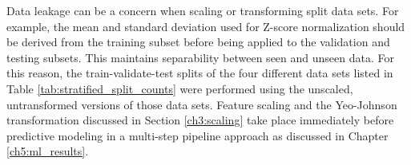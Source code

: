 Data leakage can be a concern when scaling or transforming split data sets. For example, the mean and standard deviation used for Z-score normalization should be derived from the training subset before being applied to the validation and testing subsets. This maintains separability between seen and unseen data. For this reason, the train-validate-test splits of the four different data sets listed in Table \ref{tab:stratified_split_counts} were performed using the unscaled, untransformed versions of those data sets. Feature scaling and the Yeo-Johnson transformation discussed in Section \ref{ch3:scaling} take place immediately before predictive modeling in a multi-step pipeline approach as discussed in Chapter \ref{ch5:ml_results}.
\\
\begin{table}[!htp]
\end{table}

